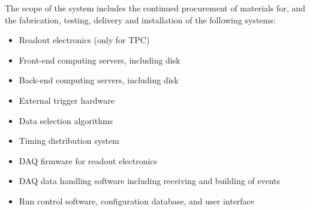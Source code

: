 
The scope of the  system includes the continued procurement
of materials for, and the fabrication, testing, delivery and
installation of the following systems:

\begin{itemize}
\item Readout electronics (only for TPC)
\item Front-end computing servers, including disk 
\item Back-end computing servers, including disk
\item External trigger hardware 
\item Data selection algorithms
\item Timing distribution system
\item DAQ firmware for readout electronics
\item DAQ data handling software including receiving and building of
  events
\item Run control software, configuration database, and user interface
\end{itemize}


